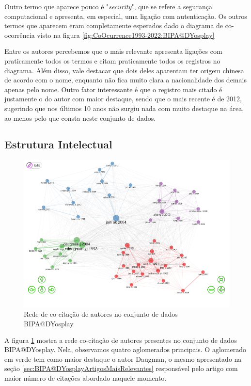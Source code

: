 Outro termo que aparece pouco é "\textit{security}", que se refere a segurança computacional e apresenta, em especial, uma ligação com autenticação. Os outros termos que aparecem eram completamente esperados dado o diagrama de co-ocorrência visto na figura \ref{fig:CoOcurrence1993-2022:BIPA@DYosplay}

Entre os autores percebemos que o mais relevante apresenta ligações com praticamente todos os termos e citam praticamente todos os registros no diagrama. Além disso, vale destacar que dois deles aparentam ter origem chinesa de acordo com o nome, enquanto não fica muito clara a nacionalidade dos demais apenas pelo nome. Outro fator interessante é que o registro mais citado é justamente o do autor com maior destaque, sendo que o mais recente é de 2012, sugerindo que nos últimos 10 anos não surgiu nada com muito destaque na área, ao menos pelo que consta neste conjunto de dados.

\subsection{Estrutura Intelectual}

\begin{figure}[H]
    \centering
    \includegraphics[width=1\textwidth]{experiments/DYosplay/PesquisaBibliometrica/Imagens/BIPA@DYosplay_CoCitation.png}
    \caption{Rede de co-citação de autores no conjunto de dados BIPA@DYosplay}
    \label{fig:CO_CITATION_BIPA@DYOSPLAY}
\end{figure}

A figura \ref{fig:CO_CITATION_BIPA@DYOSPLAY} mostra a rede co-citação de autores presentes no conjunto de dados BIPA@DYosplay. Nela, observamos quatro aglomerados principais. O aglomerado em verde tem como maior destaque o autor Daugman, o mesmo apresentado na seção \ref{sec:BIPA@DYosplayArtigosMaisRelevantes} responsável pelo artigo com maior número de citações abordado naquele momento.

